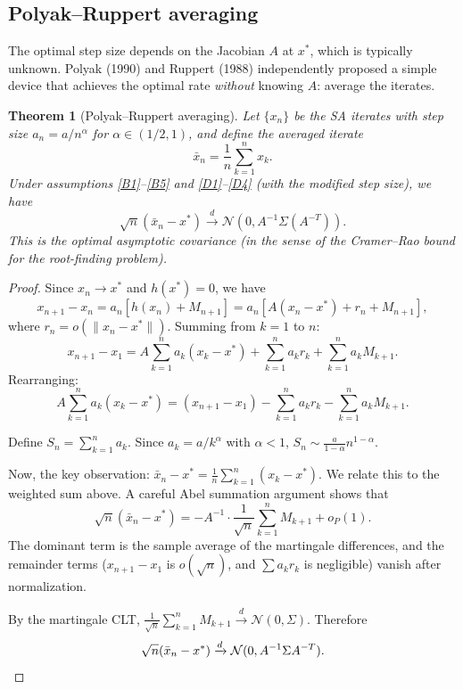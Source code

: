 \documentclass[11pt,a4paper]{article}
\theoremstyle{definition}
\theoremstyle{plain}
\newtheorem{theorem}{Theorem}[section]
\theoremstyle{remark}
\newcommand{\cdist}{\xrightarrow{d}}
\begin{document}
\subsection{Polyak--Ruppert averaging}

The optimal step size depends on the Jacobian $A$ at $x^*$, which is typically
unknown. Polyak (1990) and Ruppert (1988) independently proposed a simple device
that achieves the optimal rate \emph{without} knowing $A$: average the iterates.

\begin{theorem}[Polyak--Ruppert averaging]
\label{thm:polyak-ruppert}
Let $\{x_n\}$ be the SA iterates with step size $a_n = a/n^\alpha$ for
$\alpha \in (1/2, 1)$, and define the averaged iterate
\[
  \bar{x}_n = \frac{1}{n} \sum_{k=1}^{n} x_k.
\]
Under assumptions \ref{B1}--\ref{B5} and \ref{D1}--\ref{D4} (with the modified step
size), we have
\[
  \sqrt{n}(\bar{x}_n - x^*) \cdist \mathcal{N}(0, A^{-1} \Sigma (A^{-T})).
\]
This is the optimal asymptotic covariance (in the sense of the Cramer--Rao bound for
the root-finding problem).
\end{theorem}

\begin{proof}
Since $x_n \to x^*$ and $h(x^*) = 0$, we have
\[
  x_{n+1} - x_n = a_n [h(x_n) + M_{n+1}] = a_n [A(x_n - x^*) + r_n + M_{n+1}],
\]
where $r_n = o(\|x_n - x^*\|)$. Summing from $k = 1$ to $n$:
\[
  x_{n+1} - x_1 = A \sum_{k=1}^{n} a_k (x_k - x^*)
    + \sum_{k=1}^{n} a_k r_k + \sum_{k=1}^{n} a_k M_{k+1}.
\]
Rearranging:
\[
  A \sum_{k=1}^{n} a_k (x_k - x^*) = (x_{n+1} - x_1) - \sum_{k=1}^{n} a_k r_k
    - \sum_{k=1}^{n} a_k M_{k+1}.
\]

Define $S_n = \sum_{k=1}^n a_k$. Since $a_k = a/k^\alpha$ with $\alpha < 1$,
$S_n \sim \frac{a}{1-\alpha} n^{1-\alpha}$.

Now, the key observation: $\bar{x}_n - x^* = \frac{1}{n}\sum_{k=1}^n (x_k - x^*)$.
We relate this to the weighted sum above. A careful Abel summation argument shows
that
\[
  \sqrt{n}(\bar{x}_n - x^*)
    = -A^{-1} \cdot \frac{1}{\sqrt{n}} \sum_{k=1}^{n} M_{k+1} + o_P(1).
\]
The dominant term is the sample average of the martingale differences, and the
remainder terms ($x_{n+1} - x_1$ is $o(\sqrt{n})$, and $\sum a_k r_k$ is negligible)
vanish after normalization.

By the martingale CLT, $\frac{1}{\sqrt{n}} \sum_{k=1}^n M_{k+1} \cdist \mathcal{N}(0, \Sigma)$. Therefore
\[
  \sqrt{n}(\bar{x}_n - x^*) \cdist \mathcal{N}(0, A^{-1} \Sigma A^{-T}). \qedhere
\]
\end{proof}
\end{document}
